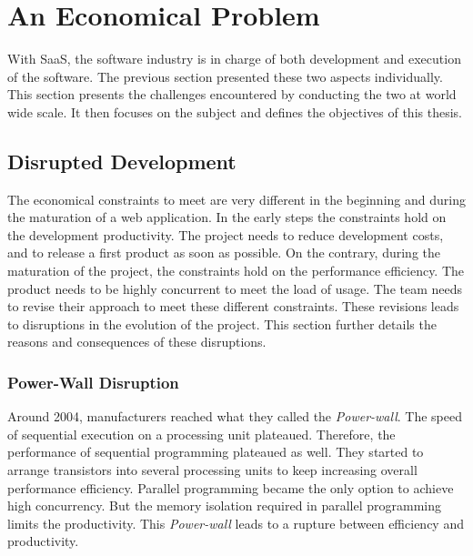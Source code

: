 \section{An Economical Problem} \label{chapter2:problem-statement}

With SaaS, the software industry is in charge of both development and execution of the software.
The previous section presented these two aspects individually.
This section presents the challenges encountered by conducting the two at world wide scale.
It then focuses on the subject and defines the objectives of this thesis.

\subsection{Disrupted Development}

The economical constraints to meet are very different in the beginning and during the maturation of a web application.
In the early steps the constraints hold on the development productivity.
The project needs to reduce development costs, and to release a first product as soon as possible.
On the contrary, during the maturation of the project, the constraints hold on the performance efficiency.
The product needs to be highly concurrent to meet the load of usage.
The team needs to revise their approach to meet these different constraints.
These revisions leads to disruptions in the evolution of the project.
This section further details the reasons and consequences of these disruptions.

\subsubsection{Power-Wall Disruption}


Around 2004, manufacturers reached what they called the \textit{Power-wall}.
The speed of sequential execution on a processing unit plateaued.
Therefore, the performance of sequential programming plateaued as well.
They started to arrange transistors into several processing units to keep increasing overall performance efficiency. %
Parallel programming became the only option to achieve high concurrency. %
But the memory isolation required in parallel programming limits the productivity.
This \textit{Power-wall} leads to a rupture between efficiency and productivity.

